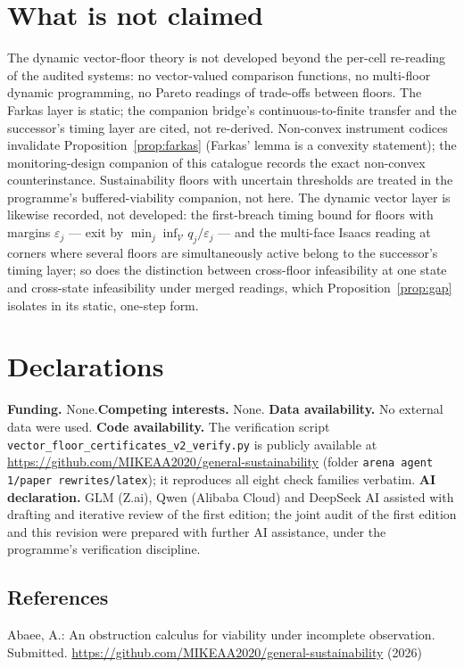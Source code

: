 \documentclass[10pt,twocolumn]{article}
\theoremstyle{definition}
\begin{document}
\section{What is not claimed}

The dynamic vector-floor theory is not developed beyond the per-cell
re-reading of the audited systems: no vector-valued comparison functions,
no multi-floor dynamic programming, no Pareto readings of trade-offs
between floors. The Farkas layer is static; the companion bridge's
continuous-to-finite transfer and the successor's timing layer are cited,
not re-derived. Non-convex instrument codices invalidate
Proposition~\ref{prop:farkas} (Farkas' lemma is a convexity statement);
the monitoring-design companion of this catalogue records the exact
non-convex counterinstance. Sustainability floors with uncertain
thresholds are treated in the programme's buffered-viability companion, not
here. The dynamic vector layer is likewise recorded, not developed: the
first-breach timing bound for floors with margins $\varepsilon_j$ --- exit
by $\min_j \inf_{\mathcal V} q_j/\varepsilon_j$ --- and the multi-face
Isaacs reading at corners where several floors are simultaneously active
belong to the successor's timing layer; so does the distinction between
cross-floor infeasibility at one state and cross-state infeasibility under
merged readings, which Proposition~\ref{prop:gap} isolates in its static,
one-step form.

\section*{Declarations}
\textbf{Funding.} None.\quad \textbf{Competing interests.} None.\quad
\textbf{Data availability.} No external data were used.\quad
\textbf{Code availability.} The verification script
\texttt{vector\_floor\_certificates\_v2\_verify.py} is publicly available at
\url{https://github.com/MIKEAA2020/general-sustainability} (folder
\texttt{arena agent 1/paper rewrites/latex}); it reproduces all eight check
families verbatim.\quad
\textbf{AI declaration.} GLM (Z.ai), Qwen (Alibaba Cloud) and DeepSeek AI
assisted with drafting and iterative review of the first edition; the joint
audit of the first edition and this revision were prepared with further AI
assistance, under the programme's verification discipline.

\subsection{References}\label{references}
{\footnotesize

Abaee, A.: An obstruction calculus for viability under incomplete
observation. Submitted.
\url{https://github.com/MIKEAA2020/general-sustainability} (2026)

}
\end{document}
